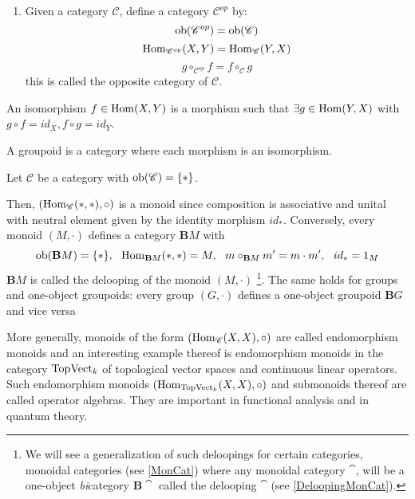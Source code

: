 \begin{ex}
\begin{enumerate}
        \item\label{CatOP}
        Given a category $\mathscr{C}$, define a category $\mathscr{C}^{op}$ by:
        $$\operatorname{ob}(\mathscr{C}^{op})=\operatorname{ob}(\mathscr{C})$$ 
        $$\operatorname{Hom}_{\mathscr{C}^{op}}(X,Y)=\operatorname{Hom}_{\mathscr{C}}(Y,X)$$ $$g\circ_{\mathscr{C}^{op}}f=f\circ_{\mathscr{C}}g$$  
        this is called the opposite category of $\mathscr{C}$.
    \end{enumerate}
\end{ex}
\begin{defn}
    An isomorphism $f\in \operatorname{Hom}(X,Y)$ is a morphism such that $\exists g \in \operatorname{Hom}(Y,X)$ with $g\circ f=id_{X}, f\circ g=id_{Y}$.
\end{defn}
\begin{defn}
    A groupoid is a category where each morphism is an isomorphism.
\end{defn}
\begin{ex}\label{Delooping Monoid}
    Let $\mathscr{C}$ be a category with $\operatorname{ob}(\mathscr{C})=\{\ast\}$. 
   
    \noindent  Then, $(\operatorname{Hom}_{\mathscr{C}}(\ast,\ast),\circ)$ is a monoid since composition is associative and unital with neutral element given by the identity morphism $id_\ast$.
    Conversely, every monoid $(M,\cdot)$ defines a category $\mathbf{B}M$ with 
    $$\ob(\mathbf{B}M)=\{\ast\}, \ \ \Hom_{\mathbf{B}M}(\ast,\ast)=M, \ \ m\circ_{\mathbf{B}M} m'=m\cdot m', \ \ id_{\ast}=1_{M}$$ 
    $\mathbf{B}M$ is called the delooping of the monoid $(M,\cdot)$
    \footnote{We will see a generalization of such deloopings for certain categories, monoidal categories (see \ref{MonCat}) where any monoidal category $\cat$, will be a one-object \emph{bi}category $\mathbf{B}\cat$ called the delooping $\cat$ (see \ref{DeloopingMonCat}).}.
    The same holds for groups and one-object groupoids: every group $(G,\cdot)$ defines a one-object groupoid $\mathbf{B}G$ and vice versa

    More generally, monoids of the form $(\operatorname{Hom}_{\mathscr{C}}(X,X),\circ)$ are called endomorphism monoids and an interesting example thereof is endomorphism monoids in the category $\operatorname{Top}\!\operatorname{Vect}_k$ of topological vector spaces and continuous linear operators. Such endomorphism monoids $(\operatorname{Hom}_{\operatorname{Top}\!\operatorname{Vect}_{k}}(X,X),\circ)$ and submonoids thereof are called operator algebras. They are important in functional analysis and in quantum theory.
\end{ex}

